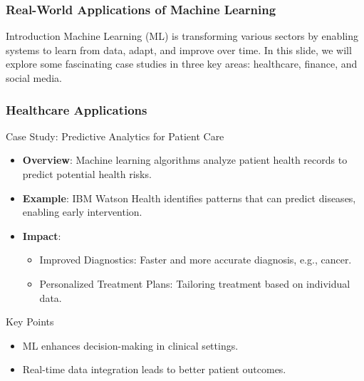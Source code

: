 \documentclass[aspectratio=169]{beamer}
\begin{document}
\begin{frame}[fragile]
    \frametitle{Real-World Applications of Machine Learning}
    \begin{block}{Introduction}
        Machine Learning (ML) is transforming various sectors by enabling systems to learn from data, adapt, and improve over time. 
        In this slide, we will explore some fascinating case studies in three key areas: healthcare, finance, and social media.
    \end{block}
\end{frame}

\begin{frame}[fragile]
    \frametitle{Healthcare Applications}
    \begin{block}{Case Study: Predictive Analytics for Patient Care}
        \begin{itemize}
            \item \textbf{Overview}: Machine learning algorithms analyze patient health records to predict potential health risks.
            \item \textbf{Example}: IBM Watson Health identifies patterns that can predict diseases, enabling early intervention.
            \item \textbf{Impact}:
            \begin{itemize}
                \item Improved Diagnostics: Faster and more accurate diagnosis, e.g., cancer.
                \item Personalized Treatment Plans: Tailoring treatment based on individual data.
            \end{itemize}
        \end{itemize}
    \end{block}
    \begin{block}{Key Points}
        \begin{itemize}
            \item ML enhances decision-making in clinical settings.
            \item Real-time data integration leads to better patient outcomes.
        \end{itemize}
    \end{block}
\end{frame}
\end{document}
